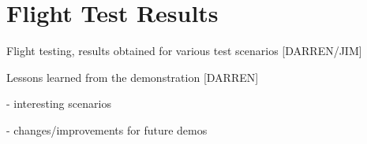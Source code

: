\section{Flight Test Results}

Flight testing, results obtained for various test scenarios [DARREN/JIM]

Lessons learned from the demonstration [DARREN]

- interesting scenarios

- changes/improvements for future demos